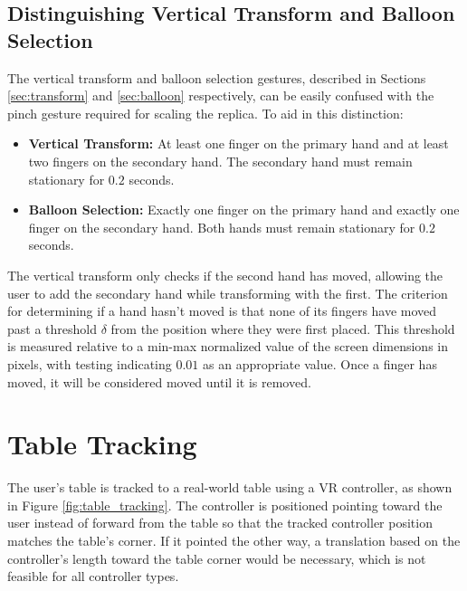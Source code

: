     \subsection{Distinguishing Vertical Transform and Balloon Selection} \label{sec:vertical_balloon}
    
        The vertical transform and balloon selection gestures, described in Sections \ref{sec:transform} and \ref{sec:balloon} respectively, can be easily confused with the pinch gesture required for scaling the replica. To aid in this distinction:
    
        \begin{itemize}
            \item \textbf{Vertical Transform:} At least one finger on the primary hand and at least two fingers on the secondary hand. The secondary hand must remain stationary for $0.2$ seconds.
            \item \textbf{Balloon Selection:} Exactly one finger on the primary hand and exactly one finger on the secondary hand. Both hands must remain stationary for $0.2$ seconds.
        \end{itemize}
    
        The vertical transform only checks if the second hand has moved, allowing the user to add the secondary hand while transforming with the first. The criterion for determining if a hand hasn't moved is that none of its fingers have moved past a threshold $\delta$ from the position where they were first placed. This threshold is measured relative to a min-max normalized value of the screen dimensions in pixels, with testing indicating $0.01$ as an appropriate value. Once a finger has moved, it will be considered moved until it is removed.

\section{Table Tracking}

    The user's table is tracked to a real-world table using a VR controller, as shown in Figure \ref{fig:table_tracking}. The controller is positioned pointing toward the user instead of forward from the table so that the tracked controller position matches the table's corner. If it pointed the other way, a translation based on the controller's length toward the table corner would be necessary, which is not feasible for all controller types.

